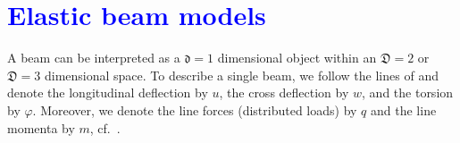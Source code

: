 \documentclass[a4paper, english, 12pt, reqno, draft]{amsart}
\theoremstyle{definition}
\theoremstyle{remark}
\numberwithin{equation}{section}
\newcommand{\locDim}{\ensuremath{\mathfrak d}}
\newcommand{\globDim}{\ensuremath{\mathfrak D}}
\newcommand{\longDef}{\ensuremath{u}}
\newcommand{\crossDef}{\ensuremath{w}}
\newcommand{\torsion}{\ensuremath{\varphi}}
\newcommand{\force}{\ensuremath{q}}
\newcommand{\momentum}{\ensuremath{m}}
\begin{document}
% 
% 
\section{\textcolor{blue}{Elastic beam models}}\label{SEC:elastic_beam}
% 
A beam can be interpreted as a $\locDim = 1$ dimensional object within an $\globDim = 2$ or $\globDim = 3$ dimensional space. To describe a single beam, we follow the lines of \cite[Sect.\ 1.2.3]{MeskourisH2013} and denote the longitudinal deflection by $\longDef$, the cross deflection by $\crossDef$, and the torsion by $\torsion$. Moreover, we denote the line forces (distributed loads) by $\force$ and the line momenta by $\momentum$, cf.\ \cite[Sect.\ 1.2.2]{MeskourisH2013}.
% 
\end{document}
